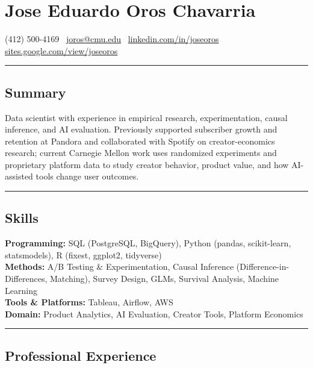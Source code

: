 \documentclass[10pt,letterpaper]{article}
\newcommand{\name}[1]{\section*{#1}}
\newcommand{\sep}{{\color{gray}\,\textbullet\,\,}}
\newcommand{\hsep}{\noindent\textcolor{gray}{\rule{\textwidth}{0.5pt}}}
\newcommand{\block}[1]{\begin{samepage}\hsep\subsection*{#1}\end{samepage}}
\begin{document}
\name{Jose Eduardo Oros Chavarria}

\begin{center}
(412) 500-4169 \sep \href{mailto:joros@cmu.edu}{joros@cmu.edu} \sep \href{https://www.linkedin.com/in/joseoros}{linkedin.com/in/joseoros} \sep \href{https://sites.google.com/view/joseoros}{sites.google.com/view/joseoros}
\end{center}

\block{Summary}

\noindent Data scientist with experience in empirical research, experimentation, causal inference, and AI evaluation. Previously supported subscriber growth and retention at Pandora and collaborated with Spotify on creator-economics research; current Carnegie Mellon work uses randomized experiments and proprietary platform data to study creator behavior, product value, and how AI-assisted tools change user outcomes.

\block{Skills}

\noindent\textbf{Programming:} SQL (PostgreSQL, BigQuery), Python (pandas, scikit-learn, statsmodels), R (fixest, ggplot2, tidyverse) \\
\textbf{Methods:} A/B Testing \& Experimentation, Causal Inference (Difference-in-Differences, Matching), Survey Design, GLMs, Survival Analysis, Machine Learning \\
\textbf{Tools \& Platforms:} Tableau, Airflow, AWS \\
\textbf{Domain:} Product Analytics, AI Evaluation, Creator Tools, Platform Economics

\block{Professional Experience}
\end{document}
